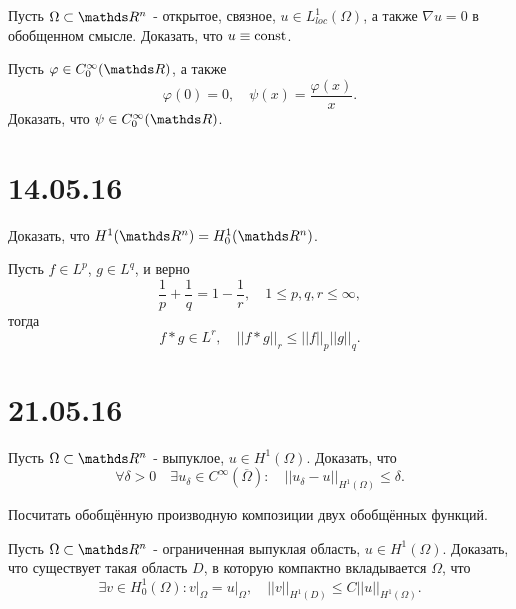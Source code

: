 \begin{exercise}
Пусть $\Omega \subset \real^n$ - открытое, связное, $u \in L_{loc}^1(\Omega)$, а также $\nabla u = 0$ в обобщенном смысле. Доказать, что $u \equiv \operatorname{const}$.
\end{exercise}

\begin{exercise} Пусть $\varphi \in C_0^{\infty} (\real)$, а также
$$ \varphi (0) = 0, \quad \psi (x) = \frac {\varphi (x)} {x} .$$
Доказать, что $\psi \in C_0^{\infty} (\real)$.
\end{exercise}

\section*{14.05.16}

\begin{exercise} Доказать, что $H^1 (\real^n) = H_0^1 (\real^n)$.
\end{exercise}

\begin{exercise}
Пусть $f \in L^p$, $g \in L^q$, и верно
$$\frac {1} {p} + \frac {1} {q} = 1 - \frac {1} {r}, \quad 1 \leq p,q,r \leq \infty, $$
тогда
$$f * g \in L^r, \quad || f*g ||_r \leq || f ||_p || g ||_q. $$
\end{exercise}

\section*{21.05.16}
\begin{exercise}
Пусть $\Omega \subset \real^n$ - выпуклое, $u \in H^1(\Omega)$. Доказать, что
$$\forall \delta > 0 \quad \exists u_{\delta} \in C^{\infty} (\overline{\Omega}):\quad ||u_{\delta} - u ||_{H^1(\Omega)} \leq \delta. $$
\end{exercise}

\begin{exercise}
Посчитать обобщённую производную композиции двух обобщённых функций.
\end{exercise}

\begin{exercise}
Пусть $\Omega \subset \real^n$ - ограниченная выпуклая область, $u \in H^1(\Omega)$. Доказать, что существует такая область $D$, в которую компактно вкладывается $\Omega$, что
$$\exists v \in H_0^1(\Omega): v\Big\rvert_{\Omega} = u\Big\rvert_{\Omega}, \quad || v ||_{H^1(D)} \leq C || u ||_{H^1(\Omega)}.$$
\end{exercise}

